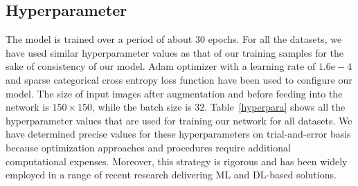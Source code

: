 \documentclass[pdflatex,sn-mathphys]{sn-jnl}%
\begin{document}
\subsection{Hyperparameter}
The model is trained over a period of about 30 epochs. For all the datasets, we have used similar hyperparameter values as that of our training samples for the sake of consistency of our model. Adam optimizer with a learning rate of $1.6\mathrm{e}-4$ and sparse categorical cross entropy loss function have been used to configure our model. The size of input images after augmentation and before feeding into the network is ${150} \times {150}$, while the batch size is $32$. 
Table~\ref{hyperpara} shows all the hyperparameter values that are used for training our network for all datasets. We have determined precise values for these hyperparameters on trial-and-error basis because optimization approaches and procedures require additional computational expenses. Moreover, this strategy is rigorous and has been widely employed in a range of recent research delivering ML and DL-based solutions.
\end{document}
